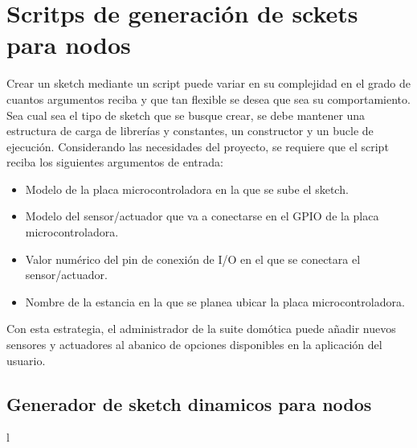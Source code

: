 \section{Scritps de generación de sckets para nodos}
\label{ch:Capitulo4.3.1}

Crear un \gls{sketch} mediante un script puede variar en su complejidad en el grado de cuantos argumentos reciba y que tan flexible se desea que sea su comportamiento. Sea cual sea el tipo de \gls{sketch} que se busque crear, se debe mantener una estructura de carga de librerías y constantes, un constructor y un bucle de ejecución. Considerando las necesidades del proyecto, se requiere que el script reciba los siguientes argumentos de entrada:

\begin{itemize}
  \item Modelo de la placa microcontroladora en la que se sube el \gls{sketch}.

  \item Modelo del sensor/actuador que va a conectarse en el GPIO de la placa microcontroladora.

  \item Valor numérico del pin de conexión de I/O en el que se conectara el sensor/actuador.
  
  \item Nombre de la estancia en la que se planea ubicar la placa microcontroladora.
\end{itemize}

Con esta estrategia, el administrador de la suite domótica puede añadir nuevos sensores y actuadores al abanico de opciones disponibles en la aplicación del usuario.

\subsection{Generador de sketch dinamicos para nodos}
l\label{ch:Capitulo4.3.2}

